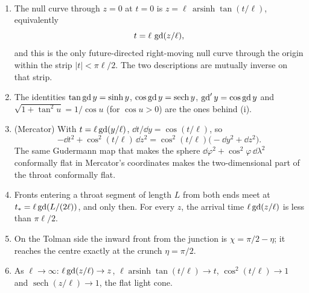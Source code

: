 \begin{theorem}\label{thm:fronts}\ver\
\begin{enumerate}[label=(\roman*)]
\item The null curve through $z=0$ at $t=0$ is $z=\ell\,\operatorname{arsinh}\tan(t/\ell)$, equivalently
\[
t=\ell\,\operatorname{gd}(z/\ell),
\]
and this is the only future-directed right-moving null curve through the origin within the strip $|t|<\pi\ell/2$. The two descriptions are mutually inverse on that strip.
\item The identities $\tan\operatorname{gd} y=\sinh y$, $\cos\operatorname{gd} y=\operatorname{sech}y$, $\operatorname{gd}'y=\cos\operatorname{gd} y$ and $\sqrt{1+\tan^2u}=1/\cos u$ (for $\cos u>0$) are the ones behind (i).
\item (Mercator) With $t=\ell\operatorname{gd}(y/\ell)$, $\dd t/\dd y=\cos(t/\ell)$, so
\[
-\dd t^2+\cos^2(t/\ell)\,\dd z^2=\cos^2(t/\ell)\bigl(-\dd y^2+\dd z^2\bigr).
\]
The same Gudermann map that makes the sphere $\dd\varphi^2+\cos^2\varphi\,\dd\lambda^2$ conformally flat in Mercator's coordinates makes the two-dimensional part of the throat conformally flat.
\item Fronts entering a throat segment of length $L$ from both ends meet at $t_*=\ell\operatorname{gd}(L/(2\ell))$, and only then. For every $z$, the arrival time $\ell\operatorname{gd}(z/\ell)$ is less than $\pi\ell/2$.
\item On the Tolman side the inward front from the junction is $\chi=\pi/2-\eta$; it reaches the centre exactly at the crunch $\eta=\pi/2$.
\item As $\ell\to\infty$: $\ell\operatorname{gd}(z/\ell)\to z$, $\ell\operatorname{arsinh}\tan(t/\ell)\to t$, $\cos^2(t/\ell)\to1$ and $\operatorname{sech}(z/\ell)\to1$, the flat light cone.
\end{enumerate}
\end{theorem}
